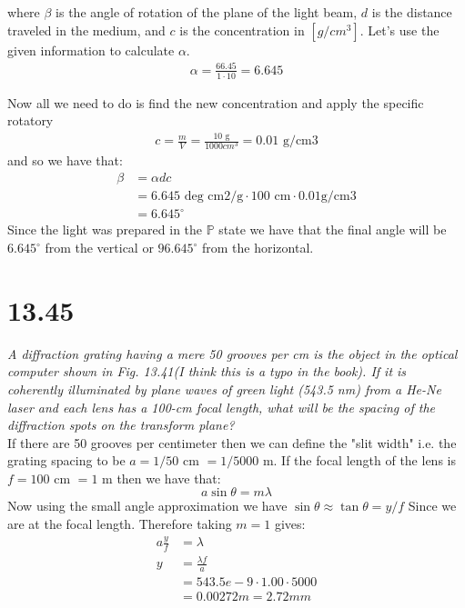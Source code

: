 \documentclass[a4paper, 11pt]{article}
\begin{document}
where $\beta$ is the angle of rotation of the plane of the light beam, $d$ is the distance traveled in the medium, and $c$ is the concentration in $[g/cm^3]$. Let's use the given information to calculate $\alpha$. 
	\begin{align*}
		\alpha = \frac{66.45}{1\cdot 10} = 6.645
	\end{align*}

Now all we need to do is find the new concentration and apply the specific rotatory 
	\begin{align*}
		c = \frac{m}{V} = \frac{10\text{ g}}{1000 \text{}cm^3} = 0.01\text{ g/cm3}
	\end{align*}
and so we have that:
	\begin{align*}
		\beta &= \alpha d c \\ 
			&= 6.645\text{ deg cm2/g}\cdot 100\text{ cm} \cdot 0.01 \text{g/cm3} \\
			&= 6.645^{\circ}
	\end{align*} 
Since the light was prepared in the $\mathbb{P}$ state we have that the final angle will be $6.645^{\circ}$ from the vertical or $96.645^{\circ}$ from the horizontal.
 
\section*{13.45}
\textit{A diffraction grating having a mere 50 grooves per cm is the
	object in the optical computer shown in Fig. 13.41(I think this is a typo in the book). If it is coherently illuminated by plane waves of green light (543.5 nm) from a He-Ne laser and each lens has a 100-cm focal length, what will be the spacing of the diffraction spots on the transform plane?} \\

If there are 50 grooves per centimeter then we can define the "slit width" i.e. the grating spacing to be $a=1/50$ cm $= 1/5000$ m. If the focal length of the lens is $f = 100$ cm $=1$ m then we have that:
	\begin{equation*}
		a\sin\theta = m\lambda
	\end{equation*}
Now using the small angle approximation we have $\sin\theta \approx \tan\theta = y/f$ Since we are at the focal length. Therefore taking $m=1$ gives: 
	\begin{align*}
		a\frac{y}{f} &= \lambda \\ 
		y &= \frac{\lambda f}{a} \\ 
			&= 543.5e-9\cdot 1.00\cdot 5000 \\ 
			&= 0.00272 m = 2.72 mm 
	\end{align*}
\end{document}
